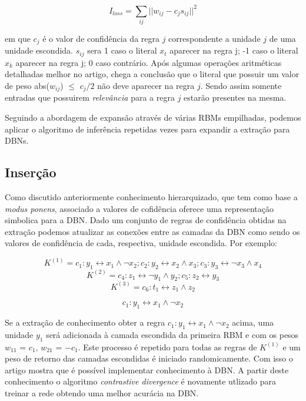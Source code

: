 \documentclass[a4paper, 12pt]{article}
\begin{document}
\begin{equation}
	I_{loss} = \sum_{ij}||w_{ij} - c_js_{ij} ||^2
\end{equation}

em que $c_j$ é o valor de confidência da regra $j$ correspondente a unidade $j$ de uma unidade escondida\cite{Tran}. $s_{ij}$ sera 1 caso o literal $x_t$ aparecer na regra j; -1 caso o literal $x_k$ aparecer na regra j; 0 caso contrário. Após algumas operações aritméticas detalhadas melhor no artigo, \cite{Tran} chega a conclusão que o literal que possuir um valor de peso abs($w_{ij}$) $\leq$ $c_j/2$ não deve aparecer na regra $j$. Sendo assim somente entradas que possuirem \textit{relevância} para a regra $j$ estarão presentes na mesma.

Seguindo a abordagem de expansão através de várias RBMs empilhadas, podemos aplicar o algoritmo de inferência\cite{Tran} repetidas vezes para expandir a extração para DBNs.

\subsection{Inserção}

Como discutido anteriormente conhecimento hierarquizado, que tem como base a \textit{modus ponens}, associado a valores de cofidência oferece uma representação simbolica para a DBN\cite{Tran}. Dado um conjunto de regras de confidência obtidas na extração podemos atualizar as conexões entre as camadas da DBN como sendo os valores de confidência de cada, respectiva, unidade escondida. Por exemplo: 

\begin{equation}
	K^{(1)} = {c_1 : y_1 \leftrightarrow x_1 \wedge \neg x_2; c_2 : y_2 \leftrightarrow x_2 \wedge x_3;c_3 : y_3 \leftrightarrow \neg x_3 \wedge  x_4 }
\end{equation}
\begin{equation}
K^{(2)} = {c_4 : z_1 \leftrightarrow \neg y_1 \wedge y_2; c_5 : z_2 \leftrightarrow y_3}
\end{equation}
\begin{equation}
K^{(3)} = {c_6 : t_1 \leftrightarrow z_1 \wedge z_2}
\end{equation}

\begin{equation}
	c_1 : y_1 \leftrightarrow x_1 \wedge \neg x_2
\end{equation}

Se a extração de conhecimento obter a regra $c_1 : y_1 \leftrightarrow x_1 \wedge \neg x_2$ acima, uma unidade $y_1$ será adicionada à camada escondida da primeira RBM e com os pesos $w_{11}$ = $c_1$, $w_{21}$ = $-c_1$. Este processo é repetido para todas as regras de $K^{(1)}$ e um peso de retorno das camadas escondidas é iniciado randomicamente. Com isso o artigo mostra que é possível implementar conhecimento à DBN. A partir deste conhecimento o algoritmo \textit{contrastive divergence} é novamente utlizado para treinar a rede obtendo uma melhor acurácia na DBN.
\end{document}
